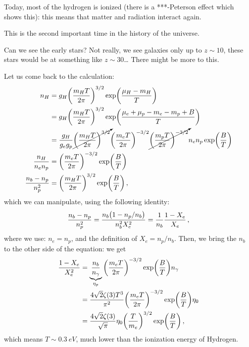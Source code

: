 \documentclass[main.tex]{subfiles}
\begin{document}
Today, most of the hydrogen is ionized (there is a ***-Peterson effect which shows this): this means that matter and radiation interact again.

This is the second important time in the history of the universe.

Can we see the early stars? Not really, we see galaxies only up to \(z \sim 10\), these stars would be at something like \(z \sim 30\)\dots
There might be more to this.

Let us come back to the calculation: 
%
\begin{subequations}
\begin{align}
  n_H &=  g_H \qty(\frac{m_H T}{2 \pi })^{3/2} \exp(\frac{\mu _H - m_H}{T})  \\
  &= g_H \qty(\frac{m_H T}{2 \pi })^{3/2} \exp(\frac{\mu_e + \mu _p - m_e - m_p + B}{T}) \\
  &= \frac{g_H}{g_e g_p} \cancelto{}{\qty(\frac{m_H T}{2 \pi })^{3/2}}
  \qty(\frac{m_e T}{2 \pi })^{-3/2}
  \cancelto{}{\qty(\frac{m_p T}{2 \pi })^{-3/2}}
  n_e n_p
  \exp(\frac{B}{T}) \\
  \frac{n_H}{n_e n_p} &=  \qty(\frac{m_e T}{2 \pi })^{-3/2} \exp(\frac{B}{T})  \\
  \frac{n_b - n_p}{n_p^2} &= \qty(\frac{m_H T}{2 \pi })^{3/2} \exp(\frac{B}{T}) 
\,,
\end{align}
\end{subequations}
%
which we can manipulate, using the following identity: 
%
\begin{align}
  \frac{n_b - n_p}{n_p^2} = \frac{n_b \qty(1 - n_p / n_b)}{n_b^2 X_e^2} = \frac{1}{n_b} \frac{1 - X_e}{X_e}
\,,
\end{align}
%
where we use: \(n_e = n_p\), and the definition of \(X_e = n_p / n_b\). Then, we bring the \(n_b\) to the other side of the equation: we get
%
\begin{subequations}
\begin{align}
  \frac{1- X_e}{X_e^2} &= \underbrace{\frac{n_b}{n_\gamma }}_{\eta_p} \qty(\frac{m_e T}{2 \pi })^{-3/2} \exp(\frac{B}{T})  n_\gamma  \\
  &= \frac{4 \sqrt{2} \zeta (3)T^3}{\pi^2} \qty(\frac{m_e T}{2 \pi })^{-3/2} \exp(\frac{B}{T}) \eta _0  \\
  &= \frac{4 \sqrt{2} \zeta (3)}{\sqrt{\pi }} \eta_0 \qty(\frac{T}{m_e})^{3/2} \exp(\frac{B}{T})
\,,
\end{align}
\end{subequations}
%
which means \(T \sim \SI{0.3}{eV}\), much lower than the ionization energy of Hydrogen.
\end{document}

